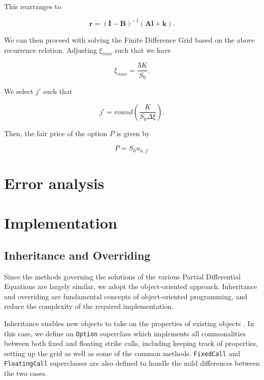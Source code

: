 \documentclass{article}
\begin{document}
This rearranges to

\begin{equation}
  \textbf{r} = (\textbf{I} - \textbf{B})^{-1}(\textbf{Al}+\textbf{k}).
\end{equation}

We can then proceed with solving the Finite Difference Grid based on the above recurrence relation. Adjusting \(\xi_{max}\) such that we have

\begin{equation}
  \xi_{max} = \frac{3K}{S_0}.
\end{equation}

We select \(j'\) such that

\begin{equation}
  j' = round(\frac{K}{S_0\Delta\xi}).
\end{equation}

Then, the fair price of the option \(P\) is given by

\begin{equation}
  P = S_0 u_{n, j'}
\end{equation}

\section{Error analysis}


\section{Implementation}

\subsection{Inheritance and Overriding}
Since the methods governing the solutions of the various Partial Differential Equations are largely similar, we adopt the object-oriented approach. Inheritance and overriding are fundamental concepts of object-oriented programming, and reduce the complexity of the required implementation.

Inheritance enables new objects to take on the properties of existing objects \cite{oop_inheritance}. In this case, we define an \texttt{Option} superclass which implements all commonalities between both fixed and floating strike calls, including keeping track of properties, setting up the grid as well as some of the common methods. \texttt{FixedCall} and \texttt{FloatingCall} superclasses are also defined to handle the mild differences between the two cases.
\end{document}
